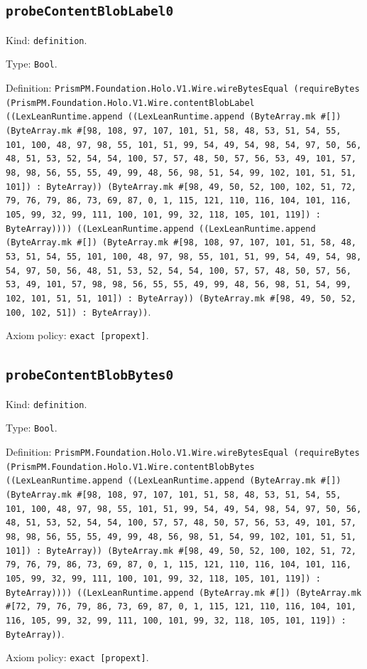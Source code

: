 \documentclass[11pt]{article}
\begin{document}
\subsection*{\texttt{probeContentBlobLabel0}}
\noindent Kind: \texttt{definition}.\par
\noindent Type: \texttt{Bool}.\par
\noindent Definition: \texttt{PrismPM.Foundation.Holo.V1.Wire.wireBytesEqual (requireBytes (PrismPM.Foundation.Holo.V1.Wire.contentBlobLabel ((LexLeanRuntime.append ((LexLeanRuntime.append (ByteArray.mk \#[]) (ByteArray.mk \#[98, 108, 97, 107, 101, 51, 58, 48, 53, 51, 54, 55, 101, 100, 48, 97, 98, 55, 101, 51, 99, 54, 49, 54, 98, 54, 97, 50, 56, 48, 51, 53, 52, 54, 54, 100, 57, 57, 48, 50, 57, 56, 53, 49, 101, 57, 98, 98, 56, 55, 55, 49, 99, 48, 56, 98, 51, 54, 99, 102, 101, 51, 51, 101]) : ByteArray)) (ByteArray.mk \#[98, 49, 50, 52, 100, 102, 51, 72, 79, 76, 79, 86, 73, 69, 87, 0, 1, 115, 121, 110, 116, 104, 101, 116, 105, 99, 32, 99, 111, 100, 101, 99, 32, 118, 105, 101, 119]) : ByteArray)))) ((LexLeanRuntime.append ((LexLeanRuntime.append (ByteArray.mk \#[]) (ByteArray.mk \#[98, 108, 97, 107, 101, 51, 58, 48, 53, 51, 54, 55, 101, 100, 48, 97, 98, 55, 101, 51, 99, 54, 49, 54, 98, 54, 97, 50, 56, 48, 51, 53, 52, 54, 54, 100, 57, 57, 48, 50, 57, 56, 53, 49, 101, 57, 98, 98, 56, 55, 55, 49, 99, 48, 56, 98, 51, 54, 99, 102, 101, 51, 51, 101]) : ByteArray)) (ByteArray.mk \#[98, 49, 50, 52, 100, 102, 51]) : ByteArray))}.\par
\noindent Axiom policy: \texttt{exact [propext]}.\par
\subsection*{\texttt{probeContentBlobBytes0}}
\noindent Kind: \texttt{definition}.\par
\noindent Type: \texttt{Bool}.\par
\noindent Definition: \texttt{PrismPM.Foundation.Holo.V1.Wire.wireBytesEqual (requireBytes (PrismPM.Foundation.Holo.V1.Wire.contentBlobBytes ((LexLeanRuntime.append ((LexLeanRuntime.append (ByteArray.mk \#[]) (ByteArray.mk \#[98, 108, 97, 107, 101, 51, 58, 48, 53, 51, 54, 55, 101, 100, 48, 97, 98, 55, 101, 51, 99, 54, 49, 54, 98, 54, 97, 50, 56, 48, 51, 53, 52, 54, 54, 100, 57, 57, 48, 50, 57, 56, 53, 49, 101, 57, 98, 98, 56, 55, 55, 49, 99, 48, 56, 98, 51, 54, 99, 102, 101, 51, 51, 101]) : ByteArray)) (ByteArray.mk \#[98, 49, 50, 52, 100, 102, 51, 72, 79, 76, 79, 86, 73, 69, 87, 0, 1, 115, 121, 110, 116, 104, 101, 116, 105, 99, 32, 99, 111, 100, 101, 99, 32, 118, 105, 101, 119]) : ByteArray)))) ((LexLeanRuntime.append (ByteArray.mk \#[]) (ByteArray.mk \#[72, 79, 76, 79, 86, 73, 69, 87, 0, 1, 115, 121, 110, 116, 104, 101, 116, 105, 99, 32, 99, 111, 100, 101, 99, 32, 118, 105, 101, 119]) : ByteArray))}.\par
\noindent Axiom policy: \texttt{exact [propext]}.\par
\end{document}
